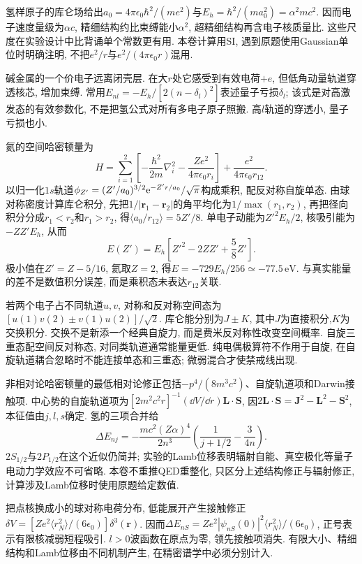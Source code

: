 氢样原子的库仑场给出$a_0=4\pi\epsilon_0\hbar^2/(me^2)$与$E_h=\hbar^2/(ma_0^2)=\alpha^2mc^2$. 因而电子速度量级为$\alpha c$, 精细结构约比束缚能小$\alpha^2$, 超精细结构再含电子核质量比. 这些尺度在实验设计中比背诵单个常数更有用. 本卷计算用SI, 遇到原题使用Gaussian单位时明确注明, 不把$e^2/r$与$e^2/(4\pi\epsilon_0r)$混用.

碱金属的一个价电子远离闭壳层. 在大$r$处它感受到有效电荷$+e$, 但低角动量轨道穿透核芯, 增加束缚. 常用$E_{nl}=-E_h/[2(n-\delta_l)^2]$表述量子亏损$\delta_l$; 该式是对高激发态的有效参数化, 不是把氢公式对所有多电子原子照搬. 高$l$轨道的穿透小, 量子亏损也小.

氦的空间哈密顿量为
\[H=\sum_{i=1}^2\left[-\frac{\hbar^2}{2m}\nabla_i^2-\frac{Ze^2}{4\pi\epsilon_0r_i}\right]+\frac{e^2}{4\pi\epsilon_0r_{12}}.\]
以归一化$1s$轨道$\phi_{Z'}=(Z'/a_0)^{3/2}\mathrm e^{-Z'r/a_0}/\sqrt\pi$构成乘积, 配反对称自旋单态. 由球对称密度计算库仑积分, 先把$1/|\mathbf r_1-\mathbf r_2|$的角平均化为$1/\max(r_1,r_2)$, 再把径向积分分成$r_1<r_2$和$r_1>r_2$, 得$\langle a_0/r_{12}\rangle=5Z'/8$. 单电子动能为$Z'^2E_h/2$, 核吸引能为$-ZZ'E_h$, 从而
\[E(Z')=E_h\left[Z'^2-2ZZ'+\frac58Z'\right].\]
极小值在$Z'=Z-5/16$, 氦取$Z=2$, 得$E=-729E_h/256\simeq-77.5\,\mathrm{eV}$. 与真实能量的差不是数值积分误差, 而是乘积态未表达$r_{12}$关联.

若两个电子占不同轨道$u,v$, 对称和反对称空间态为$[u(1)v(2)\pm v(1)u(2)]/\sqrt2$. 库仑能分别为$J\pm K$, 其中$J$为直接积分,$K$为交换积分. 交换不是新添一个经典自旋力, 而是费米反对称性改变空间概率. 自旋三重态配空间反对称态, 对同类轨道通常能量更低. 纯电偶极算符不作用于自旋, 在自旋轨道耦合忽略时不能连接单态和三重态; 微弱混合才使禁戒线出现.

非相对论哈密顿量的最低相对论修正包括$-p^4/(8m^3c^2)$、自旋轨道项和Darwin接触项. 中心势的自旋轨道项为$[2m^2c^2r]^{-1}(\dd V/\dd r)\mathbf L\cdot\mathbf S$, 因$2\mathbf L\cdot\mathbf S=\mathbf J^2-\mathbf L^2-\mathbf S^2$, 本征值由$j,l,s$确定. 氢的三项合并给
\[\Delta E_{nj}=-\frac{mc^2(Z\alpha)^4}{2n^3}\left(\frac1{j+1/2}-\frac3{4n}\right).\]
$2S_{1/2}$与$2P_{1/2}$在这个近似仍简并; 实验的Lamb位移表明辐射自能、真空极化等量子电动力学效应不可省略. 本卷不重推QED重整化, 只区分上述结构修正与辐射修正, 计算涉及Lamb位移时使用原题给定数值.

把点核换成小的球对称电荷分布, 低能展开产生接触修正$\delta V=[Ze^2\langle r_N^2\rangle/(6\epsilon_0)]\delta^3(\mathbf r)$. 因而$\Delta E_{nS}=Ze^2|\psi_{nS}(0)|^2\langle r_N^2\rangle/(6\epsilon_0)$, 正号表示有限核减弱短程吸引. $l>0$波函数在原点为零, 领先接触项消失. 有限大小、精细结构和Lamb位移由不同机制产生, 在精密谱学中必须分别计入.

